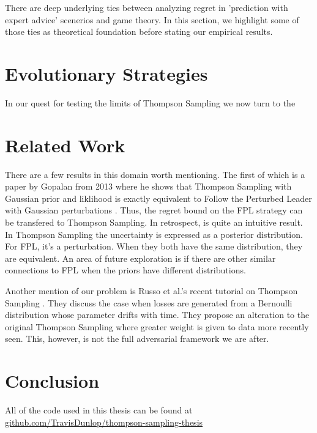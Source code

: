 \documentclass[10pt,a4paper]{article} %
\begin{document}
	There are deep underlying ties between analyzing regret in 'prediction with expert advice' scenerios and game theory.  In this section, we highlight some of those ties as theoretical foundation before stating our empirical results.  
	

	\section{Evolutionary Strategies}	
	
	In our quest for testing the limits of Thompson Sampling we now turn to the 
	
	\section{Related Work}
	
	There are a few results in this domain worth mentioning.  The first of which is a paper by Gopalan from 2013 where he shows that Thompson Sampling with Gaussian prior and liklihood is exactly equivalent to Follow the Perturbed Leader with Gaussian perturbations \cite{FPL_TS_Gaussian}.  Thus, the regret bound on the FPL strategy can be transfered to Thompson Sampling.  In retrospect, is quite an intuitive result.  In Thompson Sampling the uncertainty is expressed as a posterior distribution. For FPL, it's a perturbation.  When they both have the same distribution, they are equivalent. 	An area of future exploration is if there are other similar connections to FPL when the priors have different distributions.
	
	Another mention of our problem is Russo et al.'s recent tutorial on Thompson Sampling \cite{Russo_TS}.  They discuss the case when losses are generated from a Bernoulli distribution whose parameter drifts with time.  They propose an alteration to the original Thompson Sampling where greater weight is given to data more recently seen.  This, however, is not the full adversarial framework we are after.

	\section{Conclusion}
	
	All of the code used in this thesis can be found at \url{github.com/TravisDunlop/thompson-sampling-thesis}
	
	
	\nocite{*}
	
	
\end{document}
